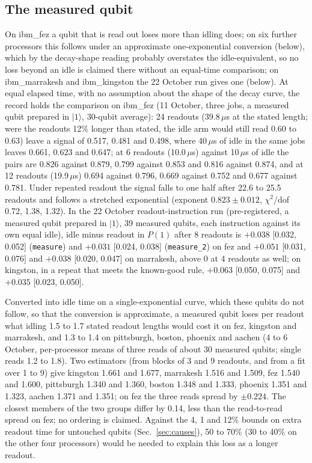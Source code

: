 \documentclass[reprint,amsmath,amssymb,aps,superscriptaddress,nofootinbib]{revtex4-2}
\newcommand{\us}{\,$\mu$s}
\begin{document}
\subsection{The measured qubit}\label{sec:measured}

On ibm\_fez a qubit that is read out loses more than idling does; on six further processors this follows under an approximate one-exponential conversion (below), which by the decay-shape reading probably overstates the idle-equivalent, so no loss beyond an idle is claimed there without an equal-time comparison; on ibm\_marrakesh and ibm\_kingston the 22 October run gives one (below). At equal elapsed time, with no assumption about the shape of the decay curve, the record holds the comparison on ibm\_fez (11 October, three jobs, a measured qubit prepared in $|1\rangle$, 30-qubit average): 24 readouts (39.8\us{} at the stated length; were the readouts 12\% longer than stated, the idle arm would still read 0.60 to 0.63) leave a signal of 0.517, 0.481 and 0.498, where 40\us{} of idle in the same jobs leaves 0.661, 0.623 and 0.647; at 6 readouts (10.0\us) against 10\us{} of idle the pairs are 0.826 against 0.879, 0.799 against 0.853 and 0.816 against 0.874, and at 12 readouts (19.9\us) 0.694 against 0.796, 0.669 against 0.752 and 0.677 against 0.781. Under repeated readout the signal falls to one half after 22.6 to 25.5 readouts and follows a stretched exponential (exponent $0.823\pm0.012$, $\chi^2$/dof 0.72, 1.38, 1.32). In the 22 October readout-instruction run (pre-registered, a measured qubit prepared in $|1\rangle$, 39 measured qubits, each instruction against its own equal idle), idle minus readout in $P(1)$ after 8 readouts is $+0.038$ [0.032, 0.052] (\texttt{measure}) and $+0.031$ [0.024, 0.038] (\texttt{measure\_2}) on fez and $+0.051$ [0.031, 0.076] and $+0.038$ [0.020, 0.047] on marrakesh, above 0 at 4 readouts as well; on kingston, in a repeat that meets the known-good rule, $+0.063$ [0.050, 0.075] and $+0.035$ [0.023, 0.050].

Converted into idle time on a single-exponential curve, which these qubits do not follow, so that the conversion is approximate, a measured qubit loses per readout what idling 1.5 to 1.7 stated readout lengths would cost it on fez, kingston and marrakesh, and 1.3 to 1.4 on pittsburgh, boston, phoenix and aachen (4 to 6 October, per-processor means of three reads of about 30 measured qubits; single reads 1.2 to 1.8). Two estimators (from blocks of 3 and 9 readouts, and from a fit over 1 to 9) give kingston 1.661 and 1.677, marrakesh 1.516 and 1.509, fez 1.540 and 1.600, pittsburgh 1.340 and 1.360, boston 1.348 and 1.333, phoenix 1.351 and 1.323, aachen 1.371 and 1.351; on fez the three reads spread by $\pm0.224$. The closest members of the two groups differ by 0.14, less than the read-to-read spread on fez; no ordering is claimed. Against the 4, 1 and 12\% bounds on extra readout time for untouched qubits (Sec.~\ref{sec:causes}), 50 to 70\% (30 to 40\% on the other four processors) would be needed to explain this loss as a longer readout.
\end{document}
